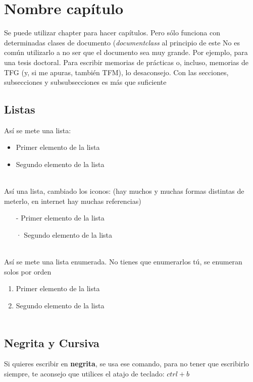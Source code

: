 \documentclass{article}
\begin{document}
\chapter{Nombre capítulo}
Se puede utilizar chapter para hacer capítulos. Pero sólo funciona con determinadas clases de documento (\textit{documentclass} al principio de este No es común utilizarlo a no ser que el documento sea muy grande. Por ejemplo, para una tesis doctoral. Para escribir memorias de prácticas o, incluso, memorias de TFG (y, si me apuras, también TFM), lo desaconsejo. Con las secciones, subsecciones y subsubsecciones es más que suficiente

\section{Listas}
Así se mete una lista:

\begin{itemize}
	\item Primer elemento de la lista
    \item Segundo elemento de la lista \\ \\ 
\end{itemize}

Así una lista, cambiado los iconos: (hay muchos y muchas formas distintas de meterlo, en internet hay muchas referencias)
\begin{itemize}
	\item[-] Primer elemento de la lista
    \item[·] Segundo elemento de la lista \\ \\ 
\end{itemize}

Así se mete una lista enumerada. No tienes que enumerarlos tú, se enumeran solos por orden
\begin{enumerate}
	\item Primer elemento de la lista
    \item Segundo elemento de la lista \\ \\  
\end{enumerate}

\section{Negrita y Cursiva}
Si quieres escribir en \textbf{negrita}, se usa ese comando, para no tener que escribirlo siempre, te aconsejo que utilices el atajo de teclado: $ctrl+b$
\end{document}
